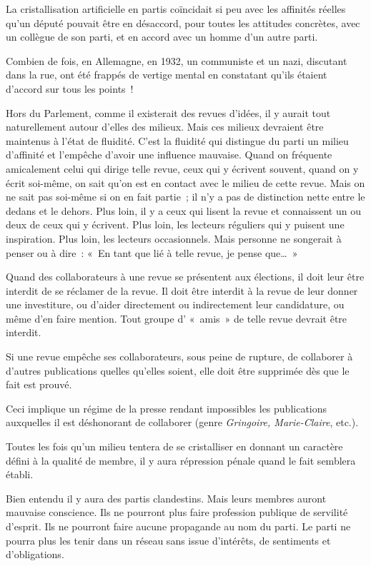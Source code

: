 \documentclass[french,twoside]{book} %
\begin{document}
La cristallisation artificielle en partis coïncidait si peu avec les affinités réelles qu’un député pouvait être en désaccord, pour toutes les attitudes concrètes, avec un collègue de son parti, et en accord avec un homme d’un autre parti.\par
Combien de fois, en Allemagne, en 1932, un communiste et un nazi, discutant dans la rue, ont été frappés de vertige mental en constatant qu’ils étaient d’accord sur tous les points !\par
Hors du Parlement, comme il existerait des revues d’idées, il y aurait tout naturellement autour d’elles des milieux. Mais ces milieux devraient être maintenus à l’état de fluidité. C’est la fluidité qui distingue du parti un milieu d’affinité et l’empêche d’avoir une influence mauvaise. Quand on fréquente amicalement celui qui dirige telle revue, ceux qui y écrivent souvent, quand on y écrit soi-même, on sait qu’on est en contact avec le milieu de cette revue. Mais on ne sait pas soi-même si on en fait partie ; il n’y a pas de distinction nette entre le dedans et le dehors. Plus loin, il y a ceux qui lisent la revue et connaissent un ou deux de ceux qui y écrivent. Plus loin, les lecteurs réguliers qui y puisent une inspiration. Plus loin, les lecteurs occasionnels. Mais personne ne songerait à penser ou à dire : « En tant que lié à telle revue, je pense que… »\par
Quand des collaborateurs à une revue se présentent aux élections, il doit leur être interdit de se réclamer de la revue. Il doit être interdit à la revue de leur donner une investiture, ou d’aider directement ou indirectement leur candidature, ou même d’en faire mention. Tout groupe d’ « amis » de telle revue devrait être interdit.\par
Si une revue empêche ses collaborateurs, sous peine de rupture, de collaborer à d’autres publications quelles qu’elles soient, elle doit être supprimée dès que le fait est prouvé.\par
Ceci implique un régime de la presse rendant impossibles les publications auxquelles il est déshonorant de collaborer (genre \emph{Gringoire, Marie-Claire}, etc.).\par
Toutes les fois qu’un milieu tentera de se cristalliser en donnant un caractère défini à la qualité de membre, il y aura répression pénale quand le fait semblera établi.\par
Bien entendu il y aura des partis clandestins. Mais leurs membres auront mauvaise conscience. Ils ne pourront plus faire profession publique de servilité d’esprit. Ils ne pourront faire aucune propagande au nom du parti. Le parti ne pourra plus les tenir dans un réseau sans issue d’intérêts, de sentiments et d’obligations.\par
\end{document}
